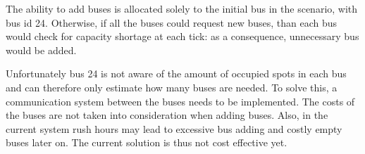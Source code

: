 \documentclass[a4paper]{article}
\begin{document}
The ability to add buses is allocated solely to the initial bus in the scenario, with bus id 24. Otherwise, if all the buses could request new buses, than each bus would check for capacity shortage at each tick: as a consequence, unnecessary bus would be added. 

Unfortunately bus 24 is not aware of the amount of occupied spots in each bus and can therefore only estimate how many buses are needed. To solve this, a communication system between the buses needs to be implemented. The costs of the buses are not taken into consideration when adding buses. Also, in the current system rush hours may lead to excessive bus adding and costly empty buses later on. The current solution is thus not cost effective yet.
\end{document}
